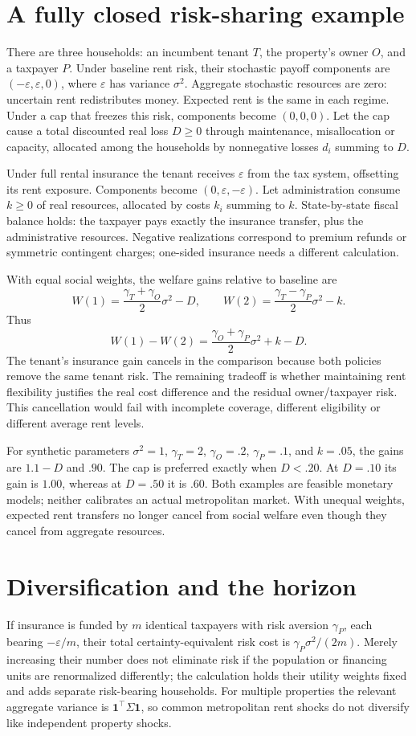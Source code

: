 \documentclass[11pt]{article}
\begin{document}
\section*{A fully closed risk-sharing example}
There are three households: an incumbent tenant $T$, the property's owner $O$, and a taxpayer $P$. Under baseline rent risk, their stochastic payoff components are $(-\varepsilon,\varepsilon,0)$, where $\varepsilon$ has variance $\sigma^2$. Aggregate stochastic resources are zero: uncertain rent redistributes money. Expected rent is the same in each regime. Under a cap that freezes this risk, components become $(0,0,0)$. Let the cap cause a total discounted real loss $D\geq0$ through maintenance, misallocation or capacity, allocated among the households by nonnegative losses $d_i$ summing to $D$.

Under full rental insurance the tenant receives $\varepsilon$ from the tax system, offsetting its rent exposure. Components become $(0,\varepsilon,-\varepsilon)$. Let administration consume $k\geq0$ of real resources, allocated by costs $k_i$ summing to $k$. State-by-state fiscal balance holds: the taxpayer pays exactly the insurance transfer, plus the administrative resources. Negative realizations correspond to premium refunds or symmetric contingent charges; one-sided insurance needs a different calculation.

With equal social weights, the welfare gains relative to baseline are
\[
 W(1)=\frac{\gamma_T+\gamma_O}{2}\sigma^2-D,
 \qquad
 W(2)=\frac{\gamma_T-\gamma_P}{2}\sigma^2-k.
\]
Thus
\[
 W(1)-W(2)=\frac{\gamma_O+\gamma_P}{2}\sigma^2+k-D.       \tag{2}
\]
The tenant's insurance gain cancels in the comparison because both policies remove the same tenant risk. The remaining tradeoff is whether maintaining rent flexibility justifies the real cost difference and the residual owner/taxpayer risk. This cancellation would fail with incomplete coverage, different eligibility or different average rent levels.

For synthetic parameters $\sigma^2=1$, $\gamma_T=2$, $\gamma_O=.2$, $\gamma_P=.1$, and $k=.05$, the gains are $1.1-D$ and $.90$. The cap is preferred exactly when $D<.20$. At $D=.10$ its gain is $1.00$, whereas at $D=.50$ it is $.60$. Both examples are feasible monetary models; neither calibrates an actual metropolitan market. With unequal weights, expected rent transfers no longer cancel from social welfare even though they cancel from aggregate resources.

\section*{Diversification and the horizon}
If insurance is funded by $m$ identical taxpayers with risk aversion $\gamma_P$, each bearing $-\varepsilon/m$, their total certainty-equivalent risk cost is $\gamma_P\sigma^2/(2m)$. Merely increasing their number does not eliminate risk if the population or financing units are renormalized differently; the calculation holds their utility weights fixed and adds separate risk-bearing households. For multiple properties the relevant aggregate variance is $\mathbf{1}^\top\Sigma\mathbf{1}$, so common metropolitan rent shocks do not diversify like independent property shocks.
\end{document}

